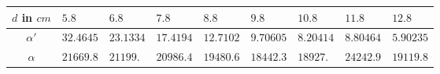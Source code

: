 \begin{tabular}{c|*{8}{*{1}{l}}}
$d$ in ${\si{cm}}$ & $5.8$ & $6.8$ & $7.8$ & $8.8$ & $9.8$ & $10.8$ & $11.8$ & $12.8$ \\ \hline
$\alpha'$ & $32.4645$ & $23.1334$ & $17.4194$ & $12.7102$ & $9.70605$ & $8.20414$ & $8.80464$ & $5.90235$ \\ \hline
$\alpha$ & $21669.8$ & $21199.$ & $20986.4$ & $19480.6$ & $18442.3$ & $18927.$ & $24242.9$ & $19119.8$\end{tabular}
